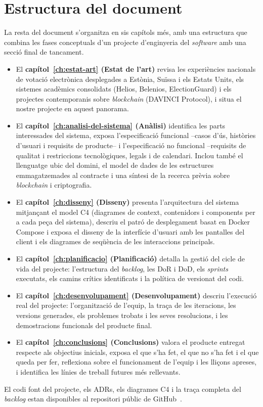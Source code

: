 

\section{Estructura del document}
\label{sec:estructura}

La resta del document s'organitza en sis capítols més, amb una estructura que combina les fases conceptuals d'un
projecte d'enginyeria del \textit{software} amb una secció final de tancament.

\begin{itemize}
    \item El \textbf{capítol~\ref{ch:estat-art} (Estat de l'art)} revisa les experiències nacionals de votació
    electrònica desplegades a Estònia, Suïssa i els Estats Units, els sistemes acadèmics consolidats (Helios, Belenios,
    ElectionGuard) i els projectes contemporanis sobre \emph{blockchain} (DAVINCI Protocol), i situa el nostre projecte
    en aquest panorama.

    \item El \textbf{capítol~\ref{ch:analisi-del-sistema} (Anàlisi)} identifica les parts interessades del sistema, exposa l'especificació
    funcional --casos d'ús, històries d'usuari i requisits de producte-- i l'especificació no funcional --requisits de
    qualitat i restriccions tecnològiques, legals i de calendari.
    Inclou també el llenguatge ubic del domini, el model de dades de les estructures emmagatzemades al contracte i una
    síntesi de la recerca prèvia sobre \emph{blockchain} i criptografia.

    \item El \textbf{capítol~\ref{ch:disseny} (Disseny)} presenta l'arquitectura del sistema mitjançant el model C4 (diagrames de
    context, contenidors i components per a cada peça del sistema), descriu el patró de desplegament basat en Docker
    Compose i exposa el disseny de la interfície d'usuari amb les pantalles del client i els diagrames de seqüència de
    les interaccions principals.

    \item El \textbf{capítol~\ref{ch:planificacio} (Planificació)} detalla la gestió del cicle de vida del projecte:
    l'estructura del \emph{backlog}, les \acf{DoR} i \acf{DoD}, els \emph{sprints} executats,
    els camins crítics identificats i la política de versionat del codi.

    \item El \textbf{capítol~\ref{ch:desenvolupament} (Desenvolupament)} descriu l'execució real del projecte: l'organització de l'equip, la
    traça de les iteracions, les versions generades, els problemes trobats i les seves resolucions, i les demostracions
    funcionals del producte final.

    \item El \textbf{capítol~\ref{ch:conclusions} (Conclusions)} valora el producte entregat respecte als objectius inicials, exposa el que
    s'ha fet, el que no s'ha fet i el que queda per fer, reflexiona sobre el funcionament de l'equip i les lliçons
    apreses, i identifica les línies de treball futures més rellevants.
\end{itemize}

El codi font del projecte, els \acp{ADR}, els diagrames C4 i la traça completa del \emph{backlog} estan disponibles al
repositori públic de GitHub~\cite{demochainrepo}.
